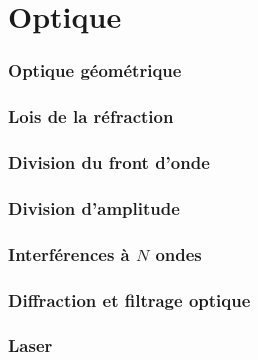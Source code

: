 \setcounter{part}{23}  %

\part{Optique}
\section{Optique géométrique}




\section{Lois de la réfraction}




\section{Division du front d'onde}





\section{Division d'amplitude}




\section{Interférences à $N$ ondes}





\section{Diffraction et filtrage optique}

\section{Laser}